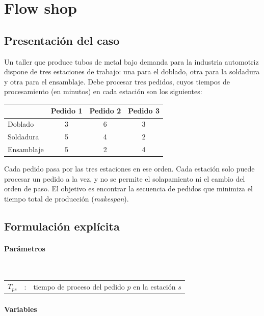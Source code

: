 \section{Flow shop}


\subsection{Presentación del caso}

Un taller que produce tubos de metal bajo demanda para la industria automotriz dispone de tres estaciones de trabajo: una para el doblado, otra para la soldadura y otra para el ensamblaje.  
Debe procesar tres pedidos, cuyos tiempos de procesamiento (en minutos) en cada estación son los siguientes:

\begin{center}
\begin{tabular}{lccc}
\toprule
 & Pedido 1 & Pedido 2 & Pedido 3 \\
\midrule
Doblado & 3 & 6 & 3 \\
Soldadura & 5 & 4 & 2 \\
Ensamblaje & 5 & 2 & 4 \\
\bottomrule
\end{tabular}
\end{center}

Cada pedido pasa por las tres estaciones en ese orden.  
Cada estación solo puede procesar un pedido a la vez, y no se permite el solapamiento ni el cambio del orden de paso.  
El objetivo es encontrar la secuencia de pedidos que minimiza el tiempo total de producción (\textit{makespan}).

\subsection{Formulación explícita}

\paragraph{Parámetros}\mbox{}\\

\begin{tabular}{l c l}
$T_{ps}$ & : & tiempo de proceso del pedido $p$ en la estación $s$ \\
\end{tabular}

\paragraph{Variables}\mbox{}\\

